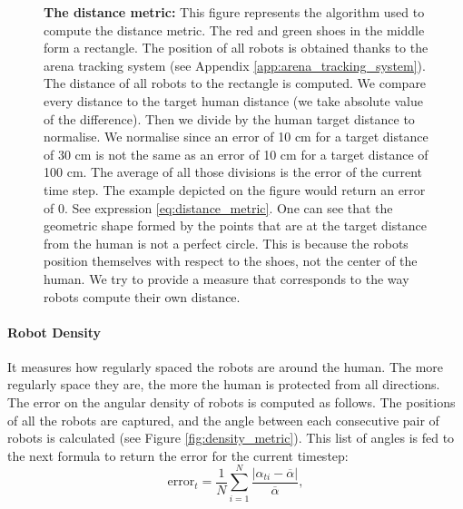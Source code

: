 \documentclass[oneside, a4paper, 12pt]{memoir}
\newcommand{\epuckblue}[3][0] %
{
	\draw [very thick, fill=RoyalBlue] (#2,#3) circle [radius=0.5];
	\draw [very thick, rotate around={#1:(#2,#3)}] (#2-0.25,#3-0.433) -- (#2,#3+0.45) -- (#2+0.25,#3-0.433);
}
\let\oldCaption\caption
\renewcommand{\caption}[2]{
\oldCaption[#1]{{\small\sffamily\bfseries #1:} #2}
}
\begin{document}
\begin{figure}[!htp]
						
						\caption{The distance metric}{This figure represents the algorithm used to compute the distance metric. The red and green shoes in the middle form a rectangle. The position of all robots is obtained thanks to the arena tracking system (see Appendix \ref{app:arena_tracking_system}). The distance of all robots to the rectangle is computed. We compare every distance to the target human distance (we take absolute value of the difference). Then we divide by the human target distance to normalise. We normalise since an error of 10 cm for a target distance of 30 cm is not the same as an error of 10 cm for a target distance of 100 cm. The average of all those divisions is the error of the current time step. The example depicted on the figure would return an error of 0. See expression \ref{eq:distance_metric}. One can see that the geometric shape formed by the points that are at the target distance from the human is not a perfect circle. This is because the robots position themselves with respect to the shoes, not the center of the human. We try to provide a measure that corresponds to the way robots compute their own distance.}
						\label{fig:distance_metric}
					\end{figure}
				
				\paragraph{Robot Density}

					
					It measures how regularly spaced the robots are around the human. The more regularly space they are, the more the human is protected from all directions. The error on the angular density of robots is computed as follows. The positions of all the robots are captured, and the angle between each consecutive pair of robots is calculated (see Figure \ref{fig:density_metric}). This list of angles is fed to the next formula to return the error for the current timestep:
					\begin{equation}
						\mbox{error}_t = \frac{1}{N} \sum_{i=1}^N \frac{|\alpha_{ti} - \overline{\alpha}|}{\overline{\alpha}},
						\label{eq:density_metric}
					\end{equation}
					
\end{document}
